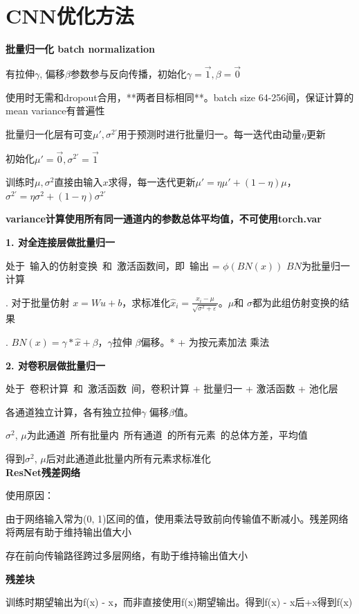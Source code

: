 \documentclass[UTF8]{ctexart}
\begin{document}
\section{CNN优化方法}
\noindent \textbf{批量归一化 batch normalization}

  有拉伸$\gamma$, 偏移$\beta$参数参与反向传播，初始化$\gamma = \vec{1}, \beta = \vec{0}$

  使用时无需和dropout合用，**两者目标相同**。batch size 64-256间，保证计算的mean variance有普遍性

  批量归一化层有可变$\mu', \sigma^{2'}$用于预测时进行批量归一。每一迭代由动量$\eta$更新
  
  \quad 初始化$\mu' = \vec{0}, \sigma^{2'} = \vec{1}$

  \quad 训练时$\mu, \sigma^2$直接由输入$x$求得，每一迭代更新$\mu' = \eta\mu' + (1 - \eta)\mu$，$\sigma^{2'} = \eta\sigma^2 + (1 - \eta)\sigma^{2'}$

  \quad \textbf{variance计算使用所有同一通道内的参数总体平均值，不可使用torch.var}

  \textbf{1. 对全连接层做批量归一}

  \quad 处于\ 输入的仿射变换\ 和\ 激活函数间，即\ 输出 = $\phi (BN(x))$ $BN$为批量归一计算

  . 对于批量仿射 $x = Wu + b$，求标准化$\hat{x}_i = \frac{{x_i} - \mu}{\sqrt{\sigma^2 + \varepsilon }}$。$\mu $和 $\sigma$都为此组仿射变换的结果

  . $BN(x) = \gamma * \hat{x} + \beta $，$\gamma$拉伸 $\beta$偏移。* + 为按元素加法 乘法

  \textbf{2. 对卷积层做批量归一}

  \quad 处于\ 卷积计算\ 和\ 激活函数\ 间，卷积计算 + 批量归一 + 激活函数 + 池化层

  \quad 各通道独立计算，各有独立拉伸$\gamma$ 偏移$\beta$值。
  
  \quad $\sigma^2$, $\mu$为此通道\ 所有批量内\ 所有通道\ 的所有元素\ 的总体方差，平均值

  \quad 得到$\sigma^2$, $\mu$后对此通道此批量内所有元素求标准化\\
\textbf{ResNet残差网络}

  使用原因：
  
  \quad 由于网络输入常为(0, 1)区间的值，使用乘法导致前向传输值不断减小。残差网络将两层有助于维持输出值大小

  \quad 存在前向传输路径跨过多层网络，有助于维持输出值大小

  \textbf{残差块}

  \quad 训练时期望输出为f(x) - x，而非直接使用f(x)期望输出。得到f(x) - x后+x得到f(x)
\end{document}
